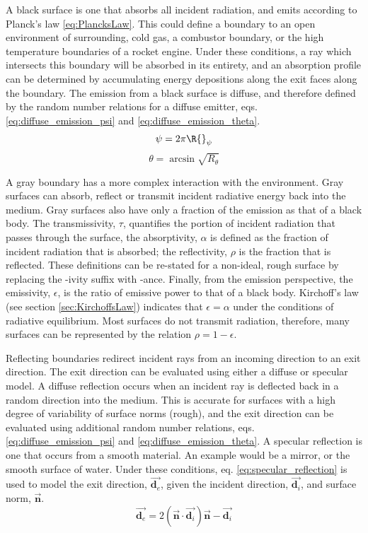 A black surface is one that absorbs all incident radiation, and emits according to Planck's law \ref{eq:PlancksLaw}. 
This could define a boundary to an open environment of surrounding, cold gas, a combustor boundary, or the high temperature boundaries of a rocket engine. 
Under these conditions, a ray which intersects this boundary will be absorbed in its entirety, and an absorption profile can be determined by accumulating energy depositions along the exit faces along the boundary. The emission from a black surface is diffuse, and therefore defined by the random number relations for a diffuse emitter, eqs. \ref{eq:diffuse_emission_psi} and \ref{eq:diffuse_emission_theta}.
\begin{equation}
    \psi{}=2\pi{}\R{}_\psi
    \label{eq:diffuse_emission_psi}
\end{equation}
\begin{equation}
    \theta = \arcsin{\sqrt{R_\theta}}
    \label{eq:diffuse_emission_theta}
\end{equation}

A gray boundary has a more complex interaction with the environment. Gray surfaces can absorb, reflect or transmit incident radiative energy back into the medium. Gray surfaces also have only a fraction of the emission as that of a black body.
The transmissivity, $\tau{}$, quantifies the portion of incident radiation that passes through the surface, the absorptivity, $\alpha$ is defined as the fraction of incident radiation that is absorbed; the reflectivity, $\rho$ is the fraction that is reflected. These definitions can be re-stated for a non-ideal, rough surface by replacing the -ivity suffix with -ance. 
Finally, from the emission perspective, the emissivity, $\epsilon$, is the ratio of emissive power to that of a black body.  Kirchoff's law (see section \ref{sec:KirchoffsLaw}) indicates that $\epsilon{}=\alpha{}$ under the conditions of radiative equilibrium.
Most surfaces do not transmit radiation, therefore, many surfaces can be represented by the relation $\rho{}=1-\epsilon$. 

Reflecting boundaries redirect incident rays from an incoming direction to an exit direction. 
The exit direction can be evaluated using either a diffuse or specular model. 
A diffuse reflection occurs when an incident ray is deflected back in a random direction into the medium. This is accurate for surfaces with a high degree of variability of surface norms (rough), and the exit direction can be evaluated using additional random number relations, eqs. \ref{eq:diffuse_emission_psi} and \ref{eq:diffuse_emission_theta}.
A specular reflection is one that occurs from a smooth material. 
An example would be a mirror, or the smooth surface of water. Under these conditions, eq. \ref{eq:specular_reflection} is used to model the exit direction, $\Vec{\textbf{d}_{e}}$, given the incident direction, $\Vec{\textbf{d}_i}$, and surface norm, $\vec{\textbf{n}}$.
\begin{equation}
    \Vec{\textbf{d}_e}=2(\Vec{\textbf{n}}\cdot\Vec{\textbf{d}_i})\Vec{\textbf{n}} -\Vec{\textbf{d}_i}
    \label{eq:specular_reflection}
\end{equation}

